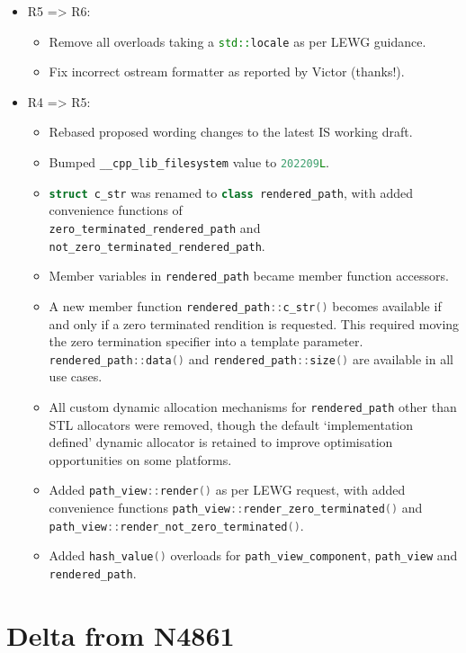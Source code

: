 \documentclass[11pt]{article}
\newcommand{\code}[2][cpp]{\lstinline[language=#1,basicstyle=\small\ttfamily]{#2}}
\begin{document}
\begin{itemize}
    \item R5 => R6:
    \begin{itemize}
    \item Remove all overloads taking a \code{std::locale} as per LEWG guidance.
    \item Fix incorrect ostream formatter as reported by Victor (thanks!). 
    \end{itemize}

    \item R4 => R5:
    \begin{itemize}
        \item Rebased proposed wording changes to the latest IS working draft.
        \item Bumped \code{__cpp_lib_filesystem} value to \code{202209L}.
        \item \code{struct c_str} was renamed to \code{class rendered_path}, with added convenience functions of \\
        \code{zero_terminated_rendered_path} and \code{not_zero_terminated_rendered_path}.
        \item Member variables in \code{rendered_path} became member function accessors.
        \item A new member function \code{rendered_path::c_str()} becomes available if and only if a zero terminated rendition is requested. This required moving the zero termination specifier into a template parameter. \code{rendered_path::data()} and \code{rendered_path::size()} are available in all use cases.
        \item All custom dynamic allocation mechanisms for \code{rendered_path} other than STL allocators were removed, though the default `implementation defined' dynamic allocator is retained to improve optimisation opportunities on some platforms.
        \item Added \code{path_view::render()} as per LEWG request, with added convenience functions \code{path_view::render_zero_terminated()} and \code{path_view::render_not_zero_terminated()}.
        \item Added \code{hash_value()} overloads for \code{path_view_component}, \code{path_view} and \code{rendered_path}.
    \end{itemize}
\end{itemize}

\section{Delta from N4861}
\end{document}
